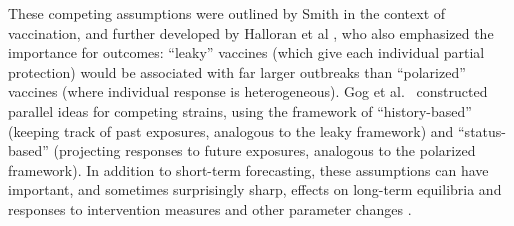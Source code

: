 \documentclass[12pt]{article}
\begin{document}
These competing assumptions were outlined by Smith \cite{smith1984assessment} in the context of vaccination, and further developed by Halloran et al \cite{ halloran1991direct,halloran1992interpretation}, who also emphasized the importance for outcomes: “leaky” vaccines (which give each individual partial protection) would be associated with far larger outbreaks than “polarized” vaccines (where individual response is heterogeneous). Gog et al.~\cite{gog2002dynamics,gog2002status} constructed parallel ideas for competing strains, using the framework of “history-based” (keeping track of past exposures, analogous to the leaky framework) and “status-based” (projecting responses to future exposures, analogous to the polarized framework). In addition to short-term forecasting, these assumptions can have important, and sometimes surprisingly sharp, effects on long-term equilibria and responses to intervention measures and other parameter changes \cite{gomes2014missing}.


\end{document}
